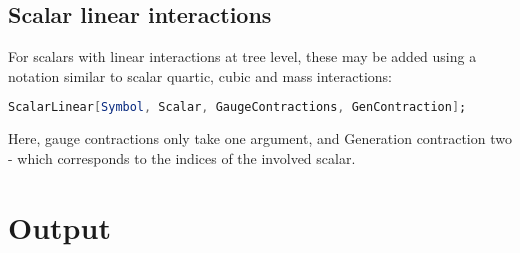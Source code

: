 \documentclass{scrartcl}
\begin{document}
\subsection{Scalar linear interactions}
For scalars with linear interactions at tree level, these may be added using a notation similar to scalar quartic, cubic and mass interactions:
\begin{lstlisting}[language=mathematica,mathescape,columns=flexible,backgroundcolor=\color{light-gray}]
ScalarLinear[Symbol, Scalar, GaugeContractions, GenContraction];
\end{lstlisting}
Here, gauge contractions only take one argument, and Generation contraction two - which corresponds to the indices of the involved scalar.
\newpage
\section{Output}
\end{document}
